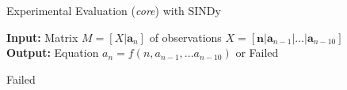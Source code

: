 \documentclass[t,usenames,dvipsnames]{beamer} %
\newcommand{\1}{\boldsymbol{1}}
\newcommand{\0}{\boldsymbol{0}}
\begin{document}
\begin{frame}{Experimental Evaluation (\textit{core}) with SINDy}
     
    \begin{algorithm}[H]
        \caption{For experimental comparison of SINDy for \textit{core} case
        }
    \raggedright
        \textbf{Input:} Matrix  $M = [X|\textbf{a}_n]$ of observations 
         $X = [\textbf{n}|\textbf{a}_{n-1}|...|\textbf{a}_{n-10}]$ 
        \\
        \textbf{Output:} Equation $a_n = f(n, a_{n-1}, ... a_{n-10})$ or Failed
    \begin{algorithmic}[1]
        \EndIf
        \EndIf
    \EndFor
    \State \Return Failed
    \EndFunction
    \end{algorithmic}
    \end{algorithm}
 \end{frame}
\end{document}
